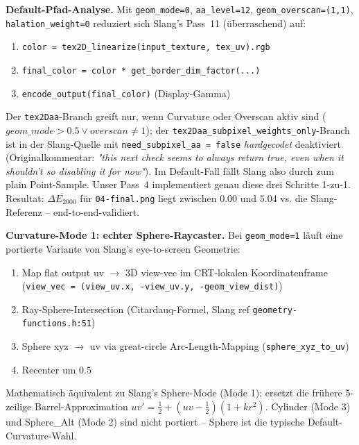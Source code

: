 \documentclass[11pt, a4paper]{article}
\begin{document}
\vspace{.5cm}
\textbf{Default-Pfad-Analyse.} Mit \texttt{geom\_mode=0}, \texttt{aa\_level=12}, \texttt{geom\_overscan=(1,1)}, \texttt{halation\_weight=0} reduziert sich Slang's Pass~11 (\"uberraschend) auf:
\begin{enumerate}[leftmargin=*, nosep]
    \item \texttt{color = tex2D\_linearize(input\_texture, tex\_uv).rgb}
    \item \texttt{final\_color = color * get\_border\_dim\_factor(...)}
    \item \texttt{encode\_output(final\_color)} (Display-Gamma)
\end{enumerate}
Der \texttt{tex2Daa}-Branch greift nur, wenn Curvature oder Overscan aktiv sind ($\mathit{geom\_mode}>0.5 \vee \mathit{overscan}\neq 1$); der \texttt{tex2Daa\_subpixel\_weights\_only}-Branch ist in der Slang-Quelle mit \texttt{need\_subpixel\_aa = false} \emph{hardgecodet} deaktiviert (Originalkommentar: \emph{"this next check seems to always return true, even when it shouldn't so disabling it for now"}). Im Default-Fall f\"allt Slang also durch zum plain Point-Sample. Unser Pass~4 implementiert genau diese drei Schritte 1-zu-1. Resultat: $\overline{\Delta E_{2000}}$ f\"ur \texttt{04-final.png} liegt zwischen $0.00$ und $5.04$ vs. die Slang-Referenz -- end-to-end-validiert.

\vspace{.5cm}
\textbf{Curvature-Mode 1: echter Sphere-Raycaster.} Bei \texttt{geom\_mode=1} l\"auft eine portierte Variante von Slang's eye-to-screen Geometrie:
\begin{enumerate}[leftmargin=*, nosep]
    \item Map flat output uv $\rightarrow$ 3D view-vec im CRT-lokalen Koordinatenframe (\texttt{view\_vec = (view\_uv.x, -view\_uv.y, -geom\_view\_dist)})
    \item Ray-Sphere-Intersection (Citardauq-Formel, Slang ref \texttt{geometry-functions.h:51})
    \item Sphere xyz $\rightarrow$ uv via great-circle Arc-Length-Mapping (\texttt{sphere\_xyz\_to\_uv})
    \item Recenter um $0.5$
\end{enumerate}
Mathematisch \"aquivalent zu Slang's Sphere-Mode (Mode 1); ersetzt die fr\"uhere 5-zeilige Barrel-Approximation $uv' = \tfrac{1}{2} + (uv - \tfrac{1}{2})(1 + k r^2)$. Cylinder (Mode 3) und Sphere\_Alt (Mode 2) sind nicht portiert -- Sphere ist die typische Default-Curvature-Wahl.
\end{document}
